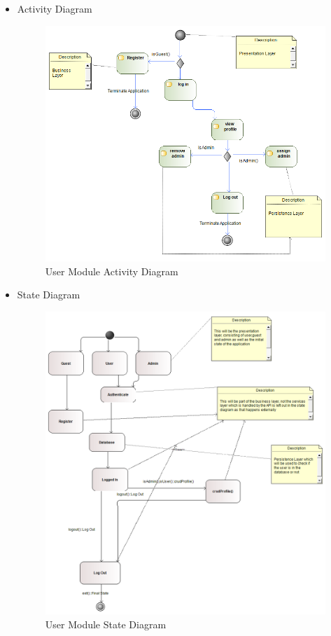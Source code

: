 \documentclass{article}
\begin{document}
\begin{itemize}
 				\item Activity Diagram
 				\begin{center}
 					\begin{figure}[!h]
 						\includegraphics[scale=0.4]{uad.png}
 						\caption{User Module Activity Diagram}
 					\end{figure}
 				\end{center}
 				\pagebreak
 				
				\item State Diagram
				\begin{center}
					\begin{figure}[!h]
						\includegraphics[scale=0.5]{smdu.png}
						\caption{User Module State Diagram}
					\end{figure}
				\end{center}
			
 		\end{itemize}
\end{document}
